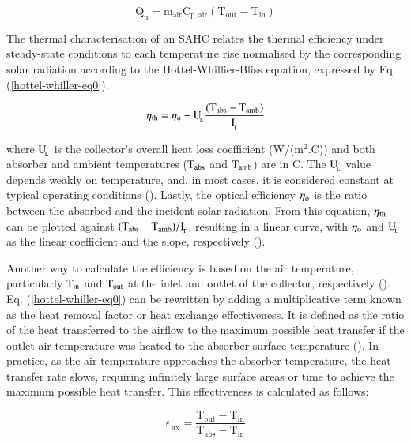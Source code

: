 \begin{equation}
	\mathrm{{Q_u} = {m_{air}}{C_{p,air}}({T_{out}} - {T_{in}})}
	\label{usefulenergy0}
\end{equation}

The thermal characterisation of an SAHC relates the thermal efficiency under steady-state conditions to each temperature rise normalised by the corresponding solar radiation according to the Hottel-Whillier-Bliss equation, expressed by Eq. (\ref{hottel-whiller-eq0}).

\begin{equation}
	\mathrm{\eta_{\rm{th}} = \eta_o - {U_{\!_L}}\frac{(T_{abs} - T_{amb})}{I_{\!_T}}}
	\label{hottel-whiller-eq0}
\end{equation}

\noindent where $\rm{U_{\!_L}}$ is the collector's overall heat loss coefficient (W/(m$^2$.\textdegree C)) and both absorber and ambient temperatures ($\rm{T_{abs}}$ and $\rm{T_{amb}}$) are in \textdegree C. The $\rm{U_{\!_L}}$ value depends weakly on temperature, and, in most cases, it is considered constant at typical operating conditions (\cite{Rabl1985}). Lastly, the optical efficiency $\eta_{\rm{o}}$ is the ratio between the absorbed and the incident solar radiation. From this equation, $\eta_{\rm{th}}$ can be plotted against $\rm{(T_{abs} - T_{amb})/I_{\!_T}}$, resulting in a linear curve, with $\eta_{\rm{o}}$ and $\rm{{U_{\!_L}}}$ as the linear coefficient and the slope, respectively (\cite{Goswami2015}). 

Another way to calculate the efficiency is based on the air temperature, particularly $\rm{T_{in}}$ and $\rm{T_{out}}$ at the inlet and outlet of the collector, respectively (\cite{Duffie2013}). Eq. (\ref{hottel-whiller-eq0}) can be rewritten by adding a multiplicative term known as the heat removal factor or heat exchange effectiveness. It is defined as the ratio of the heat transferred to the airflow to the maximum possible heat transfer if the outlet air temperature was heated to the absorber surface temperature (\cite{Kutscher1994}). In practice, as the air temperature approaches the absorber temperature, the heat transfer rate slows, requiring infinitely large surface areas or time to achieve the maximum possible heat transfer. This effectiveness is calculated as follows:

\begin{equation}
	\mathrm{\varepsilon_{\!_{HX}} = {\frac{{{T_{out}} - {T_{in}}}}{{{T_{abs}} - {T_{in}}}}}}
	\label{heat-exchange}
\end{equation}

